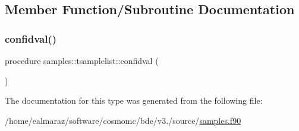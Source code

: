 \subsection{Member Function/\+Subroutine Documentation}
\mbox{\label{structsamples_1_1tsamplelist_aff4b0a39ad4271bf69f69cba0e4b5650}} 
\subsubsection{\texorpdfstring{confidval()}{confidval()}}
{\footnotesize\ttfamily procedure samples\+::tsamplelist\+::confidval (\begin{DoxyParamCaption}{ }\end{DoxyParamCaption})}



The documentation for this type was generated from the following file\+:\begin{DoxyCompactItemize}
\item 
/home/ealmaraz/software/cosmomc/bde/v3./source/\mbox{\hyperlink{samples_8f90}{samples.\+f90}}\end{DoxyCompactItemize}
